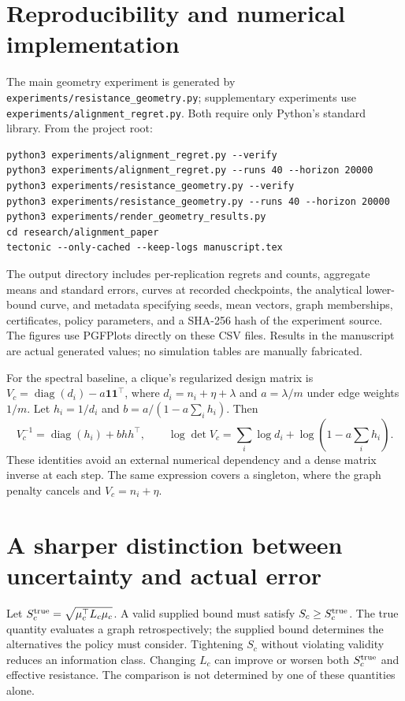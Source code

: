 \documentclass[11pt]{article}
\newcommand{\one}{\symbf{1}}
\newcommand{\diag}{\operatorname{diag}}
\begin{document}
\section{Reproducibility and numerical implementation}
The main geometry experiment is generated by
\texttt{experiments/resistance\_geometry.py}; supplementary experiments use
\texttt{experiments/alignment\_regret.py}. Both require only Python's standard library. From the project root:
\begin{verbatim}
python3 experiments/alignment_regret.py --verify
python3 experiments/alignment_regret.py --runs 40 --horizon 20000
python3 experiments/resistance_geometry.py --verify
python3 experiments/resistance_geometry.py --runs 40 --horizon 20000
python3 experiments/render_geometry_results.py
cd research/alignment_paper
tectonic --only-cached --keep-logs manuscript.tex
\end{verbatim}
The output directory includes per-replication regrets and counts, aggregate means and standard errors, curves at recorded checkpoints, the analytical lower-bound curve, and metadata specifying seeds, mean vectors, graph memberships, certificates, policy parameters, and a SHA-256 hash of the experiment source. The figures use PGFPlots directly on these CSV files. Results in the manuscript are actual generated values; no simulation tables are manually fabricated.

For the spectral baseline, a clique's regularized design matrix is
$V_c=\diag(d_i)-a\one\one^\top$, where $d_i=n_i+\eta+\lambda$ and $a=\lambda/m$ under edge weights $1/m$. Let $h_i=1/d_i$ and $b=a/(1-a\sum_i h_i)$. Then
\begin{equation}
 V_c^{-1}=\diag(h_i)+b hh^\top,\qquad
 \log\det V_c=\sum_i\log d_i+\log(1-a\sum_i h_i).
\end{equation}
These identities avoid an external numerical dependency and a dense matrix inverse at each step. The same expression covers a singleton, where the graph penalty cancels and $V_c=n_i+\eta$.

\section{A sharper distinction between uncertainty and actual error}
Let $S_c^{\rm true}=\sqrt{\mu_c^\top L_c\mu_c}$. A valid supplied bound must satisfy $S_c\ge S_c^{\rm true}$. The true quantity evaluates a graph retrospectively; the supplied bound determines the alternatives the policy must consider. Tightening $S_c$ without violating validity reduces an information class. Changing $L_c$ can improve or worsen both $S_c^{\rm true}$ and effective resistance. The comparison is not determined by one of these quantities alone.
\end{document}
